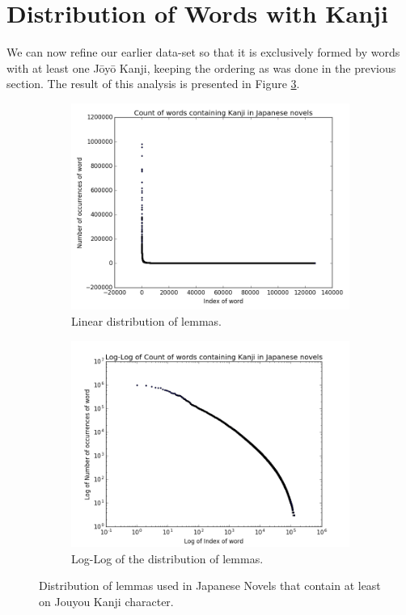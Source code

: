 \section{Distribution of Words with Kanji}\label{freq:wordwithkanji}

We can now refine our earlier data-set so that it is exclusively formed by words with at least one J\={o}y\={o} Kanji, keeping the ordering as was done in the previous section. The result of this analysis is presented in Figure \ref{fig:lemmacountwkanji}.

\begin{figure}[ht]
    \centering
    \begin{subfigure}{0.475\textwidth}
    \centering
    \includegraphics[width=0.9\linewidth]{Cap2/WordCountWithKanjiNovels}
    \caption{Linear distribution of lemmas.}
    \label{fig:lemmalinearwkanji}
    \end{subfigure}
    \begin{subfigure}{0.475\textwidth}
    \centering
    \includegraphics[width=0.9\linewidth]{Cap2/LogLogWordCountWithKanjiNovels}
    \caption{Log-Log of the distribution of lemmas.}
    \label{fig:lemmalogwkanji}
    \end{subfigure}
    
    \caption{Distribution of lemmas used in Japanese Novels that contain at least on Jouyou Kanji character.}
    \label{fig:lemmacountwkanji}
\end{figure}

